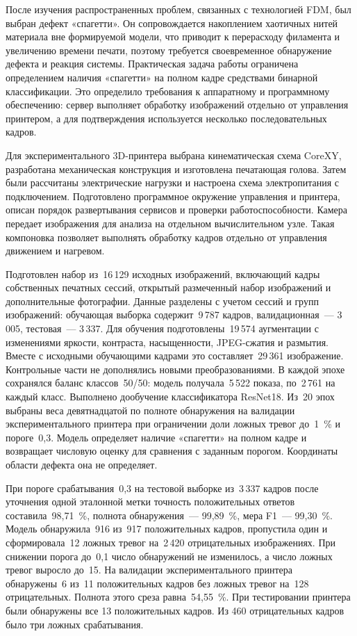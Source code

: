 \conclusion
После изучения распространенных проблем, связанных с технологией FDM, был выбран дефект «спагетти». Он сопровождается накоплением хаотичных нитей материала вне формируемой модели, что приводит к перерасходу филамента и увеличению времени печати, поэтому требуется своевременное обнаружение дефекта и реакция системы. Практическая задача работы ограничена определением наличия «спагетти» на полном кадре средствами бинарной классификации. Это определило требования к аппаратному и программному обеспечению: сервер выполняет обработку изображений отдельно от управления принтером, а для подтверждения используется несколько последовательных кадров.

Для экспериментального 3D-принтера выбрана кинематическая схема CoreXY, разработана механическая конструкция и изготовлена печатающая голова. Затем были рассчитаны электрические нагрузки и настроена схема электропитания с подключением. Подготовлено программное окружение управления и принтера, описан порядок развертывания сервисов и проверки работоспособности. Камера передает изображения для анализа на отдельном вычислительном узле. Такая компоновка позволяет выполнять обработку кадров отдельно от управления движением и нагревом.

Подготовлен набор из~16\,129 исходных изображений, включающий кадры собственных печатных сессий, открытый размеченный набор изображений и дополнительные фотографии. Данные разделены с учетом сессий и групп изображений: обучающая выборка содержит~9\,787 кадров, валидационная~--- 3\,005, тестовая~--- 3\,337. Для обучения подготовлены~19\,574 аугментации с изменениями яркости, контраста, насыщенности, JPEG-сжатия и размытия. Вместе с исходными обучающими кадрами это составляет~29\,361 изображение. Контрольные части не дополнялись новыми преобразованиями. В каждой эпохе сохранялся баланс классов~50/50: модель получала~5\,522 показа, по~2\,761 на каждый класс. Выполнено дообучение классификатора ResNet18. Из~20 эпох выбраны веса девятнадцатой по полноте обнаружения на валидации экспериментального принтера при ограничении доли ложных тревог до~1~\% и пороге~0,3. Модель определяет наличие «спагетти» на полном кадре и возвращает числовую оценку для сравнения с заданным порогом. Координаты области дефекта она не определяет.

При пороге срабатывания~0,3 на тестовой выборке из~3\,337 кадров после уточнения одной эталонной метки точность положительных ответов составила~98,71~\%, полнота обнаружения~--- 99,89~\%, мера F1~--- 99,30~\%. Модель обнаружила~916 из~917 положительных кадров, пропустила один и сформировала~12 ложных тревог на~2\,420 отрицательных изображениях. При снижении порога до~0,1 число обнаружений не изменилось, а число ложных тревог выросло до~15. На валидации экспериментального принтера обнаружены~6 из~11 положительных кадров без ложных тревог на~128 отрицательных. Полнота этого среза равна~54,55~\%. При тестировании принтера были обнаружены все 13 положительных кадров. Из 460 отрицательных кадров было три ложных срабатывания.


